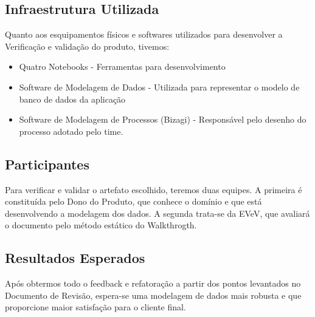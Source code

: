 \subsection{Infraestrutura Utilizada}
Quanto aos esquipamentos físicos e softwares utilizados para desenvolver a Verificação
e validação do produto, tivemos:

\begin{itemize}
  \item Quatro Notebooks - Ferramentas para desenvolvimento
  \item Software de Modelagem de Dados - Utilizada para representar o modelo de
  banco de dados da aplicação
  \item Software de Modelagem de Processos (Bizagi) - Responsável pelo desenho do
  processo adotado pelo time.
\end{itemize}

\subsection{Participantes}
Para verificar e validar o artefato escolhido, teremos duas equipes. A primeira é
constituída pelo Dono do Produto, que conhece o domínio e que está desenvolvendo
a modelagem dos dados. A segunda trata-se da EVeV, que avaliará o documento
pelo método estático do Walkthrogth.

\subsection{Resultados Esperados}
Após obtermos todo o feedback e refatoração a partir dos pontos levantados no
Documento de Revisão, espera-se uma modelagem de dados mais robusta e que proporcione
maior satisfação para o cliente final.
